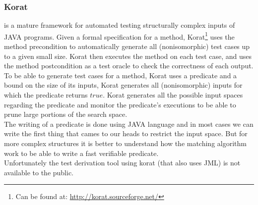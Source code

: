 \documentclass[10pt, conference, compsocconf]{IEEEtran}
\begin{document}

\subsubsection{\textbf{Korat}\cite{Boyapati02korat:automated}}
is a mature framework for automated testing structurally complex inputs of JAVA programs.
Given a formal specification for a method, Korat\footnote{Can be found at: \url{http://korat.sourceforge.net/}} uses the method precondition
to automatically generate all (nonisomorphic) test cases up to a given small size.
Korat then executes the method on each test case, and uses the method postcondition as a test oracle to check the correctness of each output.\\
To be able to generate test cases for a method, Korat uses a predicate and a bound on the size of its inputs,
Korat generates all (nonisomorphic) inputs for which the predicate returns $true$.
Korat generates all the possible input spaces regarding the predicate and monitor the predicate's executions to be able to prune large portions of the search space.\\

The writing of a predicate is done using JAVA language and in most cases we can write the first thing that cames to our heads to restrict the input space.
But for more complex structures it is better to understand how the matching algorithm work to be able to write a fast verifiable predicate.\\
Unfortunately the test derivation tool using korat (that also uses JML) is not available to the public.
\end{document}
